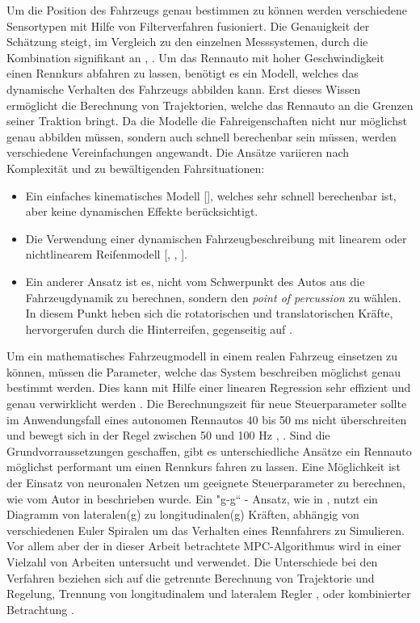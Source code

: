 \documentclass{like}
\begin{document}
Um die Position des Fahrzeugs genau bestimmen zu können werden verschiedene Sensortypen mit Hilfe von Filterverfahren fusioniert. Die Genauigkeit der Schätzung steigt, im Vergleich zu den einzelnen Messsystemen, durch die Kombination signifikant an \cite{GPS_Fusion}, \cite{GPS_IMU_Fusion}. 
Um das Rennauto mit hoher Geschwindigkeit einen Rennkurs abfahren zu lassen, benötigt es ein Modell, welches das dynamische Verhalten des Fahrzeugs abbilden kann. Erst dieses Wissen ermöglicht die Berechnung von Trajektorien, welche das Rennauto an die Grenzen seiner Traktion bringt. Da die Modelle die  Fahreigenschaften nicht nur möglichst genau abbilden müssen, sondern auch schnell berechenbar sein müssen, werden verschiedene Vereinfachungen angewandt. Die Ansätze variieren nach Komplexität und zu bewältigenden Fahrsituationen:
\begin{itemize}
	\item Ein einfaches kinematisches Modell [\cite{MPC_Kinetic}], welches sehr schnell berechenbar ist, aber keine dynamischen Effekte berücksichtigt.
	\item Die Verwendung einer dynamischen Fahrzeugbeschreibung mit linearem oder nichtlinearem Reifenmodell [\cite{rc_car_1_43}, \cite{MPC_Dynamic}, \cite{MPC_Dynamic_Tire_Model}].
	\item Ein anderer Ansatz ist es, nicht vom Schwerpunkt des Autos aus die Fahrzeugdynamik zu berechnen, sondern den \emph{point of percussion} zu wählen. In diesem Punkt heben sich die rotatorischen und translatorischen Kräfte, hervorgerufen durch die Hinterreifen, gegenseitig auf \cite{CentreOfPercussion}.
\end{itemize}

Um ein mathematisches Fahrzeugmodell in einem realen Fahrzeug einsetzen zu können, müssen die Parameter, welche das System beschreiben möglichst genau bestimmt werden. Dies kann mit Hilfe einer linearen Regression sehr effizient und genau verwirklicht werden \cite{Williams2016AggressiveDW}. Die  Berechnungszeit für neue Steuerparameter sollte im Anwendungsfall eines autonomen Rennautos 40 bis 50 ms nicht überschreiten und bewegt sich in der Regel zwischen 50 und 100 Hz \cite{rc_car_1_43}, \cite{Williams2016AggressiveDW}. 
Sind die Grundvorraussetzungen geschaffen, gibt es unterschiedliche Ansätze ein Rennauto möglichst performant um einen Rennkurs fahren zu lassen. Eine Möglichkeit ist der Einsatz von neuronalen Netzen um geeignete Steuerparameter zu berechnen, wie vom Autor in \cite{6374146} beschrieben wurde. 
Ein "g-g`` - Ansatz, wie in \cite{KRITAYAKIRANA2010548}, nutzt ein Diagramm von lateralen(g) zu longitudinalen(g) Kräften, abhängig von verschiedenen Euler Spiralen um das Verhalten eines Rennfahrers zu Simulieren. Vor allem aber der in dieser Arbeit betrachtete \ac{MPC}-Algorithmus wird in einer Vielzahl von Arbeiten untersucht und verwendet. 
Die Unterschiede bei den Verfahren beziehen sich auf die getrennte Berechnung von Trajektorie und Regelung, Trennung von longitudinalem und lateralem Regler \cite{MPC_Dynamic}, \cite{MPC_Dynamic_Tire_Model} oder kombinierter Betrachtung \cite{rc_car_1_43}.
\end{document}
